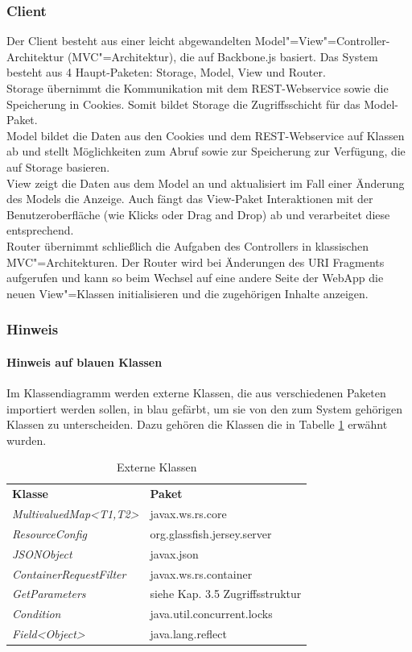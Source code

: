 \subsubsection{Client}
Der Client besteht aus einer leicht abgewandelten Model"=View"=Controller-Architektur (MVC"=Architektur), die auf Backbone.js \cite{backbone} basiert.
Das System besteht aus 4 Haupt-Paketen: Storage, Model, View und Router.\\
Storage übernimmt die Kommunikation mit dem REST-Webservice sowie die Speicherung in Cookies. Somit bildet Storage die Zugriffsschicht für das Model-Paket. \\
Model bildet die Daten aus den Cookies und dem REST-Webservice auf Klassen ab und stellt Möglichkeiten zum Abruf sowie zur Speicherung zur Verfügung, die auf Storage basieren.\\
View zeigt die Daten aus dem Model an und aktualisiert im Fall einer Änderung des Models die Anzeige. Auch fängt das View-Paket Interaktionen mit der Benutzeroberfläche (wie Klicks oder Drag and Drop) ab und verarbeitet diese entsprechend.\\
Router übernimmt schließlich die Aufgaben des Controllers in klassischen MVC"=Architekturen. Der Router wird bei Änderungen des URI Fragments aufgerufen und kann so beim Wechsel auf eine andere Seite der WebApp die neuen View"=Klassen initialisieren und die zugehörigen Inhalte anzeigen.

\subsubsection{Hinweis}  %
\paragraph{Hinweis auf blauen Klassen}Im Klassendiagramm werden externe Klassen, die aus verschiedenen Paketen importiert werden sollen, in blau gefärbt, um sie von den zum System gehörigen Klassen zu unterscheiden. Dazu gehören die Klassen die in Tabelle \ref{tab:extern_classes} erwähnt wurden.
\begin{table}
	\begin{tabular}{@{} | p{} | p{} | @{}} 
		\hline
		\textbf{Klasse} & \textbf{Paket}\\ \hhline{|=|=|}
		\textit{MultivaluedMap<T1,T2>} & javax.ws.rs.core \\ \hline
		\textit{ResourceConfig} & org.glassfish.jersey.server \\ \hline
		\textit{JSONObject} & javax.json \\ \hline
		\textit{ContainerRequestFilter} & javax.ws.rs.container \\ \hline
		\textit{GetParameters} & siehe Kap. 3.5 Zugriffsstruktur \\
		\hline
		\textit{Condition} & java.util.concurrent.locks \\
		\hline
		\textit{Field<Object>} & java.lang.reflect \\
		\hline
	\end{tabular}
	\caption{Externe Klassen}
	\label{tab:extern_classes}
\end{table}